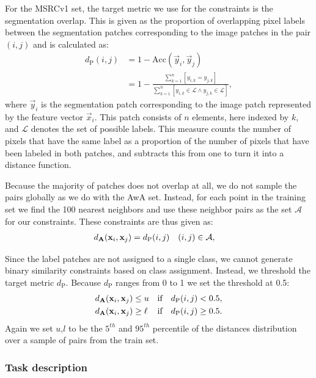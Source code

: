 For the \ac{MSRCv1} set, the target metric we use for the constraints is the segmentation overlap. This is given as the proportion of overlapping pixel labels between the segmentation patches corresponding to the image patches in the pair $(i,j)$ and is calculated as:
\begin{align}
d_{\text{P}}(i, j) &= 1 - \text{Acc}(\vec{y}_i, \vec{y}_j) \\
&= 1 - \frac{ \sum_{k=1}^{n} \left[ y_{i,k} = y_{j,k} \right] }{ \sum_{k=1}^{n} \left[ y_{i,k} \in \mathcal{L} \wedge y_{j,k} \in \mathcal{L} \right]},
\end{align}
where $\vec{y}_i$ is the segmentation patch corresponding to the image patch represented by the feature vector $\vec{x}_i$. This patch consists of $n$ elements, here indexed by $k$, and $\mathcal{L}$ denotes the set of possible labels. This measure counts the number of pixels that have the same label as a proportion of the number of pixels that have been labeled in both patches, and subtracts this from one to turn it into a distance function.

Because the majority of patches does not overlap at all, we do not sample the pairs globally as we do with the \ac{AwA} set. Instead, for each point in the training set we find the 100 nearest neighbors and use these neighbor pairs as the set $\mathcal{A}$ for our constraints. These constraints are thus given as:
\begin{align}
d_{\mathbf{A}}(\mathbf{x}_i, \mathbf{x}_j) &= d_{\text{P}}(i, j) & (i, j) &\in \mathcal{A},
\end{align}

Since the label patches are not assigned to a single class, we cannot generate binary similarity constraints based on class assignment. Instead, we threshold the target metric $d_{\text{P}}$. Because $d_{\text{P}}$ ranges from 0 to 1 we set the threshold at 0.5:
\begin{align}
d_{\mathbf{A}}(\mathbf{x}_i, \mathbf{x}_j) &\leq u & \text{if} \quad d_{\text{P}}(i, j) < 0.5, \\
d_{\mathbf{A}}(\mathbf{x}_i, \mathbf{x}_j) &\geq \ell & \text{if}  \quad d_{\text{P}}(i, j) \geq 0.5.
\end{align}
Again we set $u$,$l$ to be the $5^{th}$ and $95^{th}$ percentile of the distances distribution over a sample of pairs from the train set.

\subsubsection{Task description}

